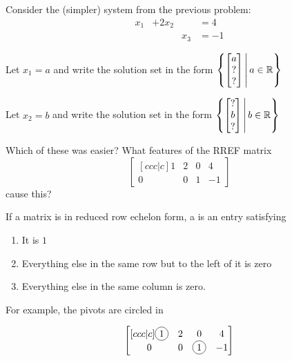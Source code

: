 \begin{applicationActivities}{2}{4}
\begin{activity}{10}
Consider the (simpler) system from the previous problem:
	\begin{alignat*}{3}
		x_1 &+ 2x_2 & &= 4\\
	     	 & &x_3 &= -1
	\end{alignat*}
\begin{subactivity}
Let $x_1=a$ and write the solution set in the form 
\( \left\{ \begin{bmatrix} a \\ ? \\ ? \end{bmatrix} \,\middle|\, a \in \mathbb{R} \right\} \)
\end{subactivity}
\begin{subactivity}
Let $x_2=b$ and write the solution set in the form 
\( \left\{ \begin{bmatrix} ? \\ b \\ ? \end{bmatrix} \,\middle|\, b \in \mathbb{R} \right\} \)
\end{subactivity}
\begin{subactivity}
Which of these was easier?  What features of the RREF matrix \[\begin{bmatrix}[ccc|c] 1 & 2 & 0 & 4 \\ 0 & 0 & 1 & -1 \end{bmatrix}\] cause this?
\end{subactivity}
\end{activity}

\begin{definition}
If a matrix is in reduced row echelon form, a  is an entry satisfying
\begin{enumerate}[1.]
\item It is $1$
\item Everything else in the same row but to the left of it is zero
\item Everything else in the same column is zero.
\end{enumerate}

For example, the pivots are circled in 

\[\begin{bmatrix}[ccc|c] \circledNumber{1} & 2 & 0 & 4 \\ 0 & 0 & \circledNumber{1} & -1 \end{bmatrix}\]
\end{definition}



\end{applicationActivities}

